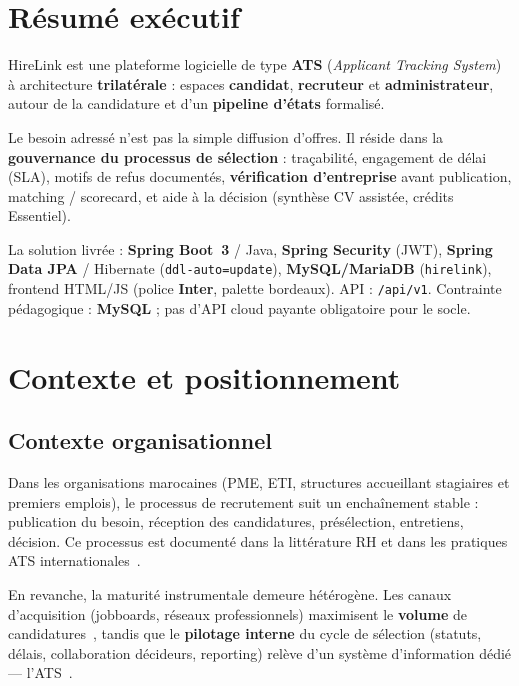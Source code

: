\documentclass[12pt,a4paper,oneside]{report}
\begin{document}
\chapter*{Résumé exécutif}

HireLink est une plateforme logicielle de type \textbf{ATS} (\textit{Applicant Tracking System}) à architecture \textbf{trilatérale} : espaces \textbf{candidat}, \textbf{recruteur} et \textbf{administrateur}, autour de la candidature et d'un \textbf{pipeline d'états} formalisé.

Le besoin adressé n'est pas la simple diffusion d'offres. Il réside dans la \textbf{gouvernance du processus de sélection} : traçabilité, engagement de délai (SLA), motifs de refus documentés, \textbf{vérification d'entreprise} avant publication, matching / scorecard, et aide à la décision (synthèse CV assistée, crédits Essentiel).

La solution livrée : \textbf{Spring Boot~3} / Java, \textbf{Spring Security} (JWT), \textbf{Spring Data JPA} / Hibernate (\texttt{ddl-auto=update}), \textbf{MySQL/MariaDB} (\texttt{hirelink}), frontend HTML/JS (police \textbf{Inter}, palette bordeaux). API : \texttt{/api/v1}. Contrainte pédagogique : \textbf{MySQL} ; pas d'API cloud payante obligatoire pour le socle.

\tableofcontents
\clearpage
{}

\chapter{Contexte et positionnement}
\label{ch:contexte}

\section{Contexte organisationnel}

Dans les organisations marocaines (PME, ETI, structures accueillant stagiaires et premiers emplois), le processus de recrutement suit un enchaînement stable : publication du besoin, réception des candidatures, présélection, entretiens, décision. Ce processus est documenté dans la littérature RH et dans les pratiques ATS internationales~\cite{africawork-ats}.

En revanche, la maturité instrumentale demeure hétérogène. Les canaux d'acquisition (jobboards, réseaux professionnels) maximisent le \textbf{volume} de candidatures~\cite{africawork-top7,rekrute-teamtailor}, tandis que le \textbf{pilotage interne} du cycle de sélection (statuts, délais, collaboration décideurs, reporting) relève d'un système d'information dédié --- l'ATS~\cite{africawork-ats,cbo-hrmaps}.
\end{document}
